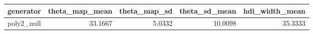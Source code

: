 \begin{tabular}{lrrrr}
\toprule
generator & theta_map_mean & theta_map_sd & theta_sd_mean & hdi_width_mean \\
\midrule
poly2_null & 33.1667 & 5.0332 & 10.0098 & 35.3333 \\
\bottomrule
\end{tabular}
